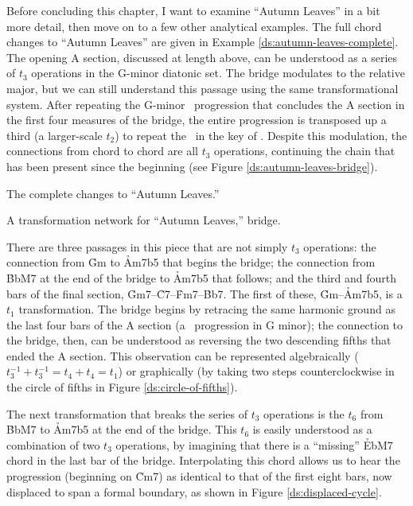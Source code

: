 \documentclass[diss]{subfiles}
\begin{document}
Before concluding this chapter, I want to examine “Autumn Leaves” in a bit
more detail, then move on to a few other analytical examples. The full chord
changes to “Autumn Leaves” are given in Example
\ref{ds:autumn-leaves-complete}. The opening A section, discussed at length
above, can be understood as a series of $t_3$ operations in the G-minor
diatonic set. The bridge modulates to the relative major, but we can still
understand this passage using the same transformational system. After
repeating the G-minor \tfo\ progression that concludes the A section in the
first four measures of the bridge, the entire progression is transposed up a
third (a larger-scale $t_2$) to repeat the \tfo\ in the key of \Bflat. Despite
this modulation, the connections from chord to chord are all $t_3$ operations,
continuing the chain that has been present since the beginning (see Figure
\ref{ds:autumn-leaves-bridge}).

\exBeg[h!tbp]
  \caption{The complete changes to “Autumn Leaves.”}
  \label{ds:autumn-leaves-complete}
\exEnd

\figBeg[htbp]
  \vspace{\baselineskip}
  \caption{A transformation network for “Autumn Leaves,” bridge.}
  \label{ds:autumn-leaves-bridge}
\figEnd

There are three passages in this piece that are not simply $t_3$ operations:
the connection from \h{Gm} to \h{Am7b5} that begins the bridge; the connection
from \h{BbM7} at the end of the bridge to \h{Am7b5} that follows; and the
third and fourth bars of the final section,
\h{Gm7}--\h{C7}--\h{Fm7}--\h{Bb7}. The first of these, \h{Gm}--\h{Am7b5}, is a
$t_1$ transformation. The bridge begins by retracing the same harmonic ground
as the last four bars of the A section (a \tfo\ progression in G minor); the
connection to the bridge, then, can be understood as reversing the two
descending fifths that ended the A section. This observation can be
represented algebraically ($t_3^{-1} + t_3^{-1} = t_4 + t_4 = t_1$) or
graphically (by taking two steps counterclockwise in the circle of fifths in
Figure \ref{ds:circle-of-fifths}).

The next transformation that breaks the series of $t_3$ operations is the
$t_6$ from \h{BbM7} to \h{Am7b5} at the end of the bridge. This $t_6$ is
easily understood as a combination of two $t_3$ operations, by imagining that
there is a “missing” \h{EbM7} chord in the last bar of the bridge.
Interpolating this chord allows us to hear the progression (beginning on
\h{Cm7}) as identical to that of the first eight bars, now displaced to span a
formal boundary, as shown in Figure \ref{ds:displaced-cycle}.
\end{document}
